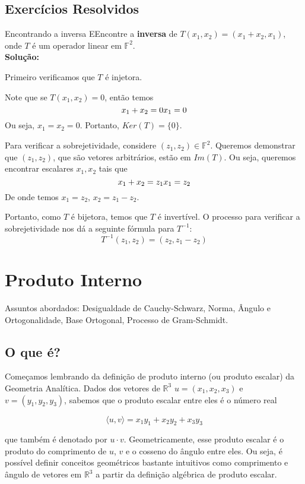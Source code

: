 \documentclass[12pt,a4paper]{article}
\begin{document}
\subsection{Exercícios Resolvidos}

\begin{exemplo}{Encontrando a inversa}
EEncontre a \textbf{inversa} de $T(x_1, x_2) = (x_1 + x_2, x_1)$, onde $T$ é um operador linear em $\mathbb{F}^2$. \\

\textbf{Solução:}

Primeiro verificamos que $T$ é injetora. 

Note que se $T(x_1, x_2) = 0$, então temos 
\[
x_1 + x_2 = 0 \\
x_1 = 0
\]
Ou seja, $x_1 = x_2 = 0$. Portanto, $Ker(T) = \{ 0 \}$. 

Para verificar a sobrejetividade, considere $(z_1, z_2) \in \mathbb{F}^2$. Queremos demonstrar que $(z_1, z_2)$, que são vetores arbitrários, estão em $Im(T)$. Ou seja, queremos encontrar escalares $x_1, x_2$ tais que
\[
x_1 + x_2 = z_1 \\
x_1 = z_2
\]
De onde temos $x_1 = z_2$, $x_2 = z_1 - z_2$.

Portanto, como $T$ é bijetora, temos que $T$ é invertível. O processo para verificar a sobrejetividade nos dá a seguinte fórmula para $T^{-1}$:
\[
T^{-1}(z_1,z_2) = (z_2, z_1-z_2)
\]
\end{exemplo}

\newpage
\section{Produto Interno}

Assuntos abordados: Desigualdade de Cauchy-Schwarz, Norma, Ângulo e Ortogonalidade, Base Ortogonal, Processo de Gram-Schmidt.

\subsection{O que é?}

Começamos lembrando da definição de produto interno (ou produto escalar) da Geometria Analítica. Dados dos vetores de $\mathbb{R}^3$ $u = (x_1, x_2, x_3)$ e $v = (y_1, y_2, y_3)$, sabemos que o produto escalar entre eles é o número real

\[
\langle u, v \rangle = x_1y_1 + x_2y_2 + x_3y_3
\]

que também é denotado por $u \cdot v$. Geometricamente, esse produto escalar é o produto do comprimento de $u$, $v$ e o cosseno do ângulo entre eles. Ou seja, é possível definir conceitos geométricos bastante intuitivos como comprimento e ângulo de vetores em $\mathbb{R}^3$ a partir da definição algébrica de produto escalar.
\end{document}
